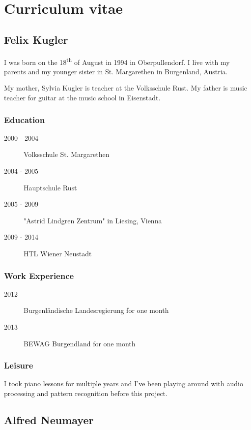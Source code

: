 \chapter{Curriculum vitae}


\section{Felix Kugler}
I was born on the 18\textsuperscript{th} of August in 1994 in Oberpullendorf. I live with my parents and my younger sister in St. Margarethen in Burgenland, Austria.

My mother, Sylvia Kugler is teacher at the Volksschule Rust. My father is music teacher for guitar at the music school in Eisenstadt.

\subsection{Education}
\begin{description}
	\item[2000 - 2004] Volksschule St. Margarethen
	\item[2004 - 2005] Hauptschule Rust
	\item[2005 - 2009] "Astrid Lindgren Zentrum" in Liesing, Vienna
	\item[2009 - 2014] HTL Wiener Neustadt
\end{description}

\subsection{Work Experience}
\begin{description}
	\item[2012] Burgenländische Landesregierung for one month
	\item[2013] BEWAG Burgendland for one month
\end{description}

\subsection{Leisure}
I took piano lessons for multiple years and I've been playing around with audio processing and pattern recognition before this project.



\section{Alfred Neumayer}

